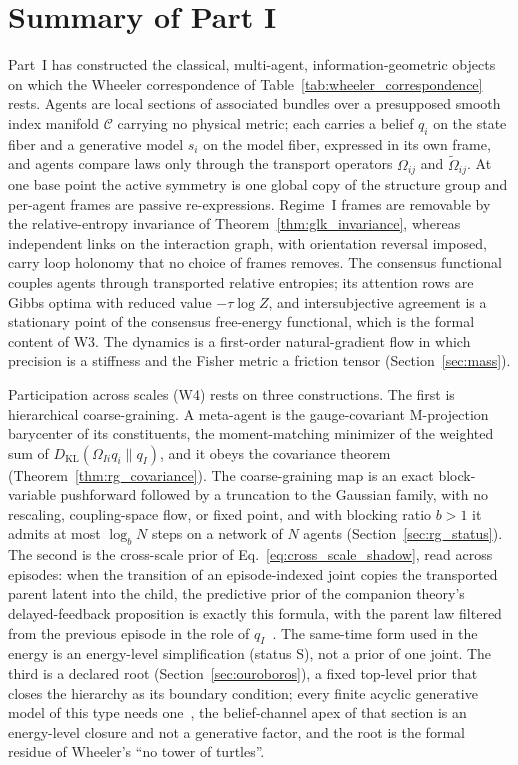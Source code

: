 \documentclass[11pt]{article}
\begin{document}
\section{Summary of Part I}\label{sec:conclusion}

Part~I has constructed the classical, multi-agent, information-geometric objects on which the Wheeler correspondence of Table~\ref{tab:wheeler_correspondence} rests. Agents are local sections of associated bundles over a presupposed smooth index manifold $\mathcal{C}$ carrying no physical metric; each carries a belief $q_i$ on the state fiber and a generative model $s_i$ on the model fiber, expressed in its own frame, and agents compare laws only through the transport operators $\Omega_{ij}$ and $\tilde\Omega_{ij}$. At one base point the active symmetry is one global copy of the structure group and per-agent frames are passive re-expressions. Regime~I frames are removable by the relative-entropy invariance of Theorem~\ref{thm:glk_invariance}, whereas independent links on the interaction graph, with orientation reversal imposed, carry loop holonomy that no choice of frames removes. The consensus functional couples agents through transported relative entropies; its attention rows are Gibbs optima with reduced value $-\tau\log Z$, and intersubjective agreement is a stationary point of the consensus free-energy functional, which is the formal content of W3. The dynamics is a first-order natural-gradient flow in which precision is a stiffness and the Fisher metric a friction tensor (Section~\ref{sec:mass}).

Participation across scales (W4) rests on three constructions. The first is hierarchical coarse-graining. A meta-agent is the gauge-covariant M-projection barycenter of its constituents, the moment-matching minimizer of the weighted sum of $D_{\mathrm{KL}}(\Omega_{Ii}q_i\|q_I)$, and it obeys the covariance theorem (Theorem~\ref{thm:rg_covariance}). The coarse-graining map is an exact block-variable pushforward followed by a truncation to the Gaussian family, with no rescaling, coupling-space flow, or fixed point, and with blocking ratio $b > 1$ it admits at most $\log_b N$ steps on a network of $N$ agents (Section~\ref{sec:rg_status}). The second is the cross-scale prior of Eq.~\eqref{eq:cross_scale_shadow}, read across episodes: when the transition of an episode-indexed joint copies the transported parent latent into the child, the predictive prior of the companion theory's delayed-feedback proposition is exactly this formula, with the parent law filtered from the previous episode in the role of $q_I$~\cite[Ch.~12]{DennisGaugeVFE2026}. The same-time form used in the energy is an energy-level simplification (status S), not a prior of one joint. The third is a declared root (Section~\ref{sec:ouroboros}), a fixed top-level prior that closes the hierarchy as its boundary condition; every finite acyclic generative model of this type needs one~\cite[Ch.~12]{DennisGaugeVFE2026}, the belief-channel apex of that section is an energy-level closure and not a generative factor, and the root is the formal residue of Wheeler's ``no tower of turtles''.
\end{document}
